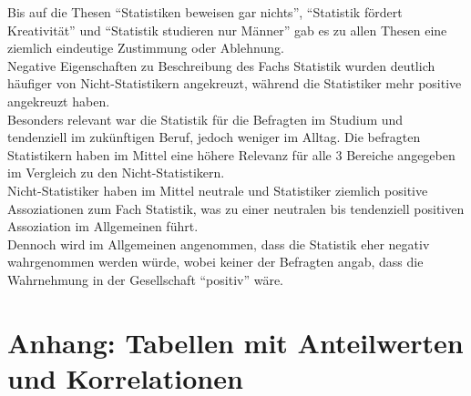 \documentclass[12pt,a4paper,titlepage=true,parskip,ngerman]{scrartcl}
\begin{document}
{\small Bis auf die Thesen \enquote{Statistiken beweisen gar nichts}, \enquote{Statistik fördert Kreativität} und \enquote{Statistik studieren nur Männer} gab es zu allen Thesen eine ziemlich eindeutige Zustimmung oder Ablehnung.\\
Negative Eigenschaften zu Beschreibung des Fachs Statistik wurden deutlich häufiger von Nicht-Statistikern angekreuzt, während die Statistiker mehr positive angekreuzt haben.\\
Besonders relevant war die Statistik für die Befragten im Studium und tendenziell im zukünftigen Beruf, jedoch weniger im Alltag. Die befragten Statistikern haben im Mittel eine höhere Relevanz für alle 3 Bereiche angegeben im Vergleich zu den Nicht-Statistikern.\\
Nicht-Statistiker haben im Mittel neutrale und Statistiker ziemlich positive Assoziationen zum Fach Statistik, was zu einer neutralen bis tendenziell positiven Assoziation im Allgemeinen führt.\\
Dennoch wird im Allgemeinen angenommen, dass die Statistik eher negativ wahrgenommen werden würde, wobei keiner der Befragten angab, dass die Wahrnehmung in der Gesellschaft \enquote{positiv} wäre.}

\section{Anhang: Tabellen mit Anteilwerten und Korrelationen}
\end{document}
